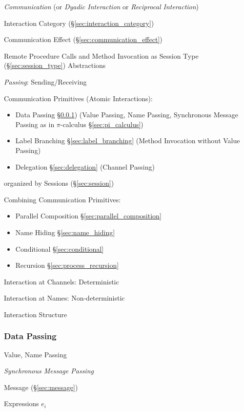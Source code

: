 \emph{Communication} (or \emph{Dyadic Interaction} or \emph{Reciprocal
  Interaction})

Interaction Category (\S\ref{sec:interaction_category})

Communication Effect (\S\ref{sec:communication_effect})

Remote Procedure Calls and Method Invocation as Session Type
(\S\ref{sec:session_type}) Abstractions
\cite{honda-vasconcelos-kubo98}

\emph{Passing}: Sending/Receiving

Communication Primitives (Atomic Interactions):
\cite{honda-vasconcelos-kubo98}
\begin{itemize}
  \item Data Passing \S\ref{sec:data_passing}) (Value Passing, Name
    Passing, Synchronous Message Passing as in $\pi$-calculus
    \S\ref{sec:pi_calculus})
  \item Label Branching \S\ref{sec:label_branching} (Method Invocation
    without Value Passing)
  \item Delegation \S\ref{sec:delegation} (Channel Passing)
\end{itemize}
organized by Sessions (\S\ref{sec:session})


Combining Communication Primitives:
\cite{honda-vasconcelos-kubo98}
\begin{itemize}
  \item Parallel Composition \S\ref{sec:parallel_composition}
  \item Name Hiding \S\ref{sec:name_hiding}
  \item Conditional \S\ref{sec:conditional}
  \item Recursion \S\ref{sec:process_recursion}
\end{itemize}


Interaction at Channels: Deterministic

Interaction at Names: Non-deterministic

Interaction Structure



\subsubsection{Data Passing}\label{sec:data_passing}

Value, Name Passing

\emph{Synchronous Message Passing}

Message (\S\ref{sec:message})

Expressions $e_i$


